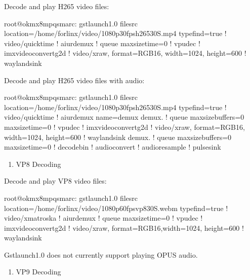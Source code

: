 \documentclass[letterpaper,10pt,openany,english]{sphinxmanual}
\begin{document}
\sphinxAtStartPar
Decode and play H265 video files:

\begin{sphinxVerbatim}[commandchars=\\\{\}]
root@ok\PYGZhy{}mx8mpq\PYGZhy{}smarc:\PYGZti{}\PYGZsh{} gst\PYGZhy{}launch\PYGZhy{}1.0 filesrc location=/home/forlinx/video/1080p\PYGZus{}30fps\PYGZus{}h265\PYGZhy{}30S.mp4 typefind=true ! video/quicktime ! aiurdemux ! queue max\PYGZhy{}size\PYGZhy{}time=0 ! vpudec ! imxvideoconvert\PYGZus{}g2d ! video/x\PYGZhy{}raw, format=RGB16, width=1024, height=600 ! waylandsink
\end{sphinxVerbatim}

\sphinxAtStartPar
Decode and play H265 video files with audio:

\begin{sphinxVerbatim}[commandchars=\\\{\}]
root@ok\PYGZhy{}mx8mpq\PYGZhy{}smarc:\PYGZti{}\PYGZsh{} gst\PYGZhy{}launch\PYGZhy{}1.0 filesrc location=/home/forlinx/video/1080p\PYGZus{}30fps\PYGZus{}h265\PYGZhy{}30S.mp4 typefind=true ! video/quicktime ! aiurdemux name=demux demux. ! queue max\PYGZhy{}size\PYGZhy{}buffers=0 max\PYGZhy{}size\PYGZhy{}time=0 ! vpudec ! imxvideoconvert\PYGZus{}g2d ! video/x\PYGZhy{}raw, format=RGB16, width=1024, height=600 ! waylandsink demux. ! queue max\PYGZhy{}size\PYGZhy{}buffers=0 max\PYGZhy{}size\PYGZhy{}time=0 ! decodebin ! audioconvert ! audioresample ! pulsesink
\end{sphinxVerbatim}
\begin{enumerate}
%
\setcounter{enumi}{2}
\item {} 
\sphinxAtStartPar
VP8 Decoding

\end{enumerate}

\sphinxAtStartPar
Decode and play VP8 video files:

\begin{sphinxVerbatim}[commandchars=\\\{\}]
root@ok\PYGZhy{}mx8mpq\PYGZhy{}smarc:\PYGZti{}\PYGZsh{} gst\PYGZhy{}launch\PYGZhy{}1.0 filesrc location=/home/forlinx/video/1080p\PYGZus{}60fps\PYGZus{}vp8\PYGZhy{}30S.webm typefind=true ! video/x\PYGZhy{}matroska ! aiurdemux ! queue max\PYGZhy{}size\PYGZhy{}time=0 ! vpudec ! imxvideoconvert\PYGZus{}g2d ! video/x\PYGZhy{}raw, format=RGB16,width=1024, height=600 ! waylandsink
\end{sphinxVerbatim}

\sphinxAtStartPar
Gst\sphinxhyphen{}launch\sphinxhyphen{}1.0 does not currently support playing OPUS audio.
\begin{enumerate}
%
\setcounter{enumi}{3}
\item {} 
\sphinxAtStartPar
VP9 Decoding

\end{enumerate}
\end{document}
